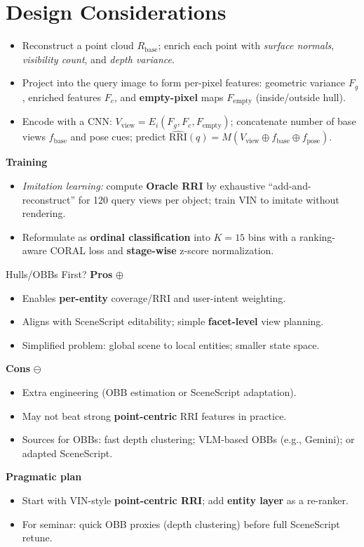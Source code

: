 \documentclass[10pt,aspectratio=169]{beamer}
\newcommand{\greenoplus}{\textcolor{mygreen}{\( \oplus \)}}
\newcommand{\redominus}{\textcolor{myred}{\( \ominus \)}}
\begin{document}
\section{Design Considerations}
\begin{itemize}
  \item Reconstruct a point cloud $R_{\text{base}}$; enrich each point with \emph{surface normals}, \emph{visibility count}, and \emph{depth variance}.
  \item Project into the query image to form per-pixel features: geometric variance $F_g$, enriched features $F_e$, and \textbf{empty-pixel} maps $F_{\text{empty}}$ (inside/outside hull).
  \item Encode with a CNN: $V_{\text{view}}=E_i(F_g, F_e, F_{\text{empty}})$; concatenate number of base views $f_{\text{base}}$ and pose cues; predict
  \(\widehat{\mathrm{RRI}}(q)=M\!\left(V_{\text{view}}\oplus f_{\text{base}}\oplus f_{\text{pose}}\right)\).
\end{itemize}
\textbf{Training}
\begin{itemize}
  \item \emph{Imitation learning:} compute \textbf{Oracle RRI} by exhaustive “add-and-reconstruct” for 120 query views per object; train VIN to imitate without rendering.
  \item Reformulate as \textbf{ordinal classification} into $K{=}15$ bins with a ranking-aware CORAL loss and \textbf{stage-wise} z-score normalization.
\end{itemize}

\begin{frame}{Hulls/OBBs First?}
\textbf{Pros} \greenoplus
\begin{itemize}
  \item Enables \textbf{per-entity} coverage/RRI and user-intent weighting.
  \item Aligns with SceneScript editability; simple \textbf{facet-level} view planning.
  \item Simplified problem: global scene to local entities; smaller state space.
\end{itemize}
\textbf{Cons} \redominus
\begin{itemize}
  \item Extra engineering (OBB estimation or SceneScript adaptation).
  \item May not beat strong \textbf{point-centric} RRI features in practice.
  \item Sources for OBBs: fast depth clustering; VLM-based OBBs (e.g., Gemini); or adapted SceneScript.
\end{itemize}
\textbf{Pragmatic plan}
\begin{itemize}
  \item Start with VIN-style \textbf{point-centric RRI}; add \textbf{entity layer} as a re-ranker.
  \item For seminar: quick OBB proxies (depth clustering) before full SceneScript retune.
\end{itemize}
\end{frame}
\end{document}
